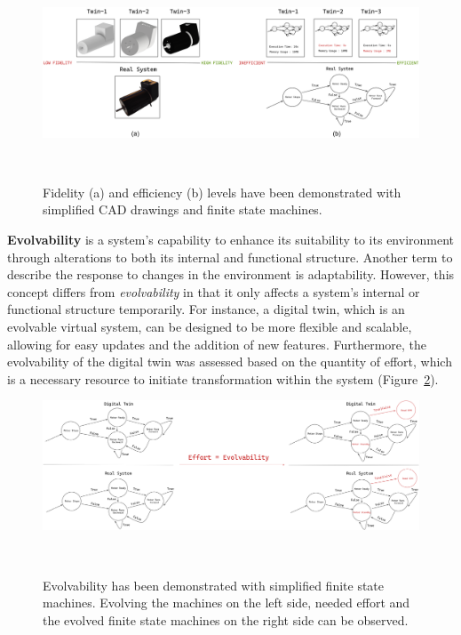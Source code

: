 \documentclass{llncs}
\begin{document}
    \begin{figure}[htbp]
        \centering
        \includegraphics[width = 1\textwidth]{Efficiency and Fidelity.png}
        \caption{Fidelity (a) and efficiency (b) levels have been demonstrated with simplified CAD drawings and 
        finite state machines.}~\label{fig:EfficiencyandFidelity}
    \end{figure}
 
    \textbf{Evolvability} is a system's capability to enhance its suitability to its environment through alterations to both its internal and functional 
    structure\cite{MobusSystemTheory}. Another term to describe the response to changes in the environment is adaptability.
    However, this concept differs from \textit{evolvability} in that it only affects a system's internal or functional structure temporarily. 
    For instance, a digital twin, which is an evolvable virtual system, can be designed to be more flexible and scalable, 
    allowing for easy updates and the addition of new features\cite{ZHANGUPDATEMETHOD}. 
    Furthermore, the evolvability of the digital twin was assessed based on the quantity of effort, which is a necessary resource to initiate transformation
    within the system (Figure~\ref{fig:Evolvability}). 

    \begin{figure}[htbp]
        \centering
        \includegraphics[width = 1\textwidth]{Evolvability.png}
        \caption{Evolvability has been demonstrated with simplified finite state machines. 
        Evolving the machines on the left side, needed effort 
        and the evolved finite state machines on the right side can be observed.}~\label{fig:Evolvability}
    \end{figure}
\end{document}
